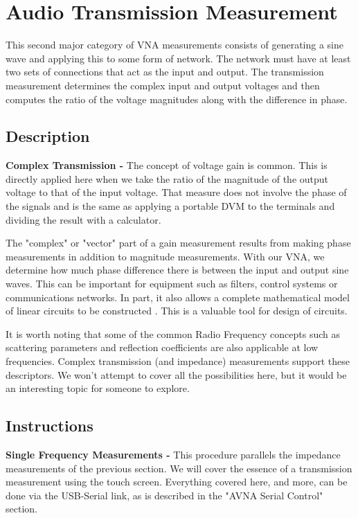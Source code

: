 \section{Audio Transmission Measurement}
This second major category of VNA measurements consists of generating a sine wave and applying this to some form of network.
 The network must have at least two sets of connections that act as the input and output.
The transmission measurement determines the complex input and output voltages and then computes the ratio of the voltage magnitudes along with the difference in phase.
%
\subsection{Description}
\textbf{Complex Transmission - }The concept of voltage gain  is common.
This is directly applied here when we take the ratio of the magnitude of the output voltage to that of the input voltage.
That measure does not involve the phase of the signals and is the same as applying a portable DVM to the terminals and dividing the result with a calculator.

The "complex" or "vector" part of a gain measurement results from making phase measurements in addition to magnitude measurements.
With our VNA, we determine how much phase difference there is between the input and output sine waves.
This can be important for equipment such as  filters, control systems or communications networks.
In part, it also allows a complete mathematical model of linear circuits to be constructed .  This is a valuable tool for design of circuits.

It is worth noting that some of the common Radio Frequency concepts such as scattering parameters and reflection coefficients are also applicable at low frequencies.  Complex transmission (and impedance) measurements support these descriptors.  We won't attempt to cover all the possibilities here, but it would be an interesting topic for someone to explore.

\subsection{Instructions}
\textbf{Single Frequency Measurements - }This procedure parallels the impedance measurements of the previous section.
We will cover the essence of a transmission measurement using the touch screen.
Everything covered here, and more, can be done via the USB-Serial link, as is described in the "AVNA Serial Control" section.

